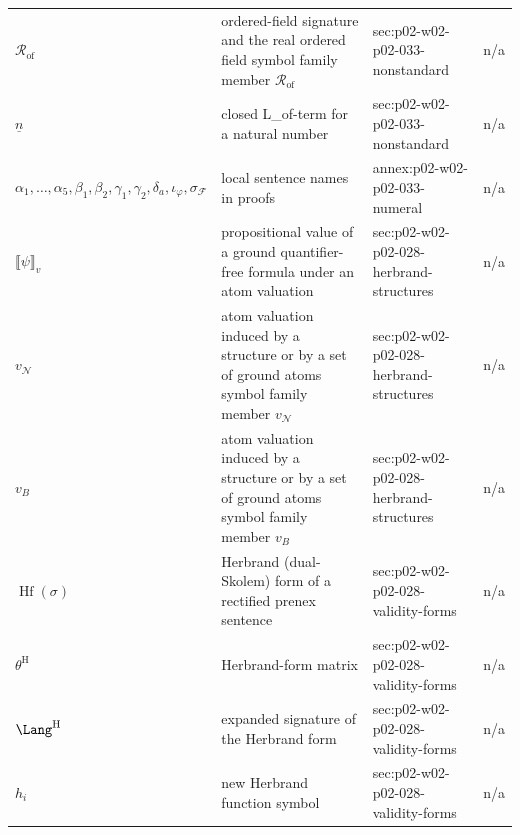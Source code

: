 \begin{longtable}{@{}p{}p{}p{}p{}@{}}
\(\mathcal R_{\mathrm{of}}\) & ordered-field signature and the real ordered field symbol family member \(\mathcal R_{\mathrm{of}}\) & sec:\allowbreak{}p02-\allowbreak{}w02-\allowbreak{}p02-\allowbreak{}033-\allowbreak{}nonstandard & n/a \\
\(\underline n\) & closed L\_of-term for a natural number & sec:\allowbreak{}p02-\allowbreak{}w02-\allowbreak{}p02-\allowbreak{}033-\allowbreak{}nonstandard & n/a \\
\(\alpha_1,\allowbreak \ldots,\allowbreak \alpha_5,\allowbreak \beta_1,\allowbreak \beta_2,\allowbreak \gamma_1,\allowbreak \gamma_2,\allowbreak \delta_a,\allowbreak \iota_\varphi,\allowbreak \sigma_{\mathcal F}\) & local sentence names in proofs & annex:\allowbreak{}p02-\allowbreak{}w02-\allowbreak{}p02-\allowbreak{}033-\allowbreak{}numeral & n/a \\
\(\llbracket\psi\rrbracket_v\) & propositional value of a ground quantifier-free formula under an atom valuation & sec:\allowbreak{}p02-\allowbreak{}w02-\allowbreak{}p02-\allowbreak{}028-\allowbreak{}herbrand-\allowbreak{}structures & n/a \\
\(v_{\mathcal N}\) & atom valuation induced by a structure or by a set of ground atoms symbol family member \(v_{\mathcal N}\) & sec:\allowbreak{}p02-\allowbreak{}w02-\allowbreak{}p02-\allowbreak{}028-\allowbreak{}herbrand-\allowbreak{}structures & n/a \\
\(v_B\) & atom valuation induced by a structure or by a set of ground atoms symbol family member \(v_B\) & sec:\allowbreak{}p02-\allowbreak{}w02-\allowbreak{}p02-\allowbreak{}028-\allowbreak{}herbrand-\allowbreak{}structures & n/a \\
\(\operatorname{Hf}(\sigma)\) & Herbrand (dual-Skolem) form of a rectified prenex sentence & sec:\allowbreak{}p02-\allowbreak{}w02-\allowbreak{}p02-\allowbreak{}028-\allowbreak{}validity-\allowbreak{}forms & n/a \\
\(\theta^{\mathrm H}\) & Herbrand-form matrix & sec:\allowbreak{}p02-\allowbreak{}w02-\allowbreak{}p02-\allowbreak{}028-\allowbreak{}validity-\allowbreak{}forms & n/a \\
\(\Lang^{\mathrm H}\) & expanded signature of the Herbrand form & sec:\allowbreak{}p02-\allowbreak{}w02-\allowbreak{}p02-\allowbreak{}028-\allowbreak{}validity-\allowbreak{}forms & n/a \\
\(h_i\) & new Herbrand function symbol & sec:\allowbreak{}p02-\allowbreak{}w02-\allowbreak{}p02-\allowbreak{}028-\allowbreak{}validity-\allowbreak{}forms & n/a \\

\end{longtable}
